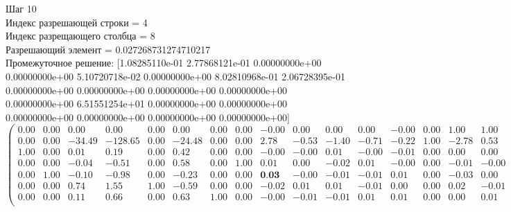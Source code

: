 \documentclass[draft]{article}
\begin{document}
\begin{flushleft}
    Шаг 10 \\
    Индекс разрешающей строки = 4\\
    Индекс разрещающего столбца = 8\\
    Разрешающий элемент = 0.027268731274710217\\
    Промежуточное решение:
    [1.08285110e-01  2.77868121e-01  0.00000000e+00  0.00000000e+00
    5.10720718e-02  0.00000000e+00  8.02810968e-01  2.06728395e-01
    0.00000000e+00  0.00000000e+00  0.00000000e+00  0.00000000e+00
    0.00000000e+00  6.51551254e+01  0.00000000e+00  0.00000000e+00
    0.00000000e+00  0.00000000e+00  0.00000000e+00  0.00000000e+00]
\begin{equation*}
\begin{pmatrix}
    0.00 & 0.00 &   0.00 &    0.00 & 0.00 &   0.00 & 0.00 & 0.00 & -0.00 &  0.00 &  0.00 &  0.00 & -0.00 & 0.00 &  1.00 &  1.00 &  1.00 &  1.00 &  1.00 &  1.00 & -0.00 \\
    0.00 & 0.00 & -34.49 & -128.65 & 0.00 & -24.48 & 0.00 & 0.00 &  2.78 & -0.53 & -1.40 & -0.71 & -0.22 & 1.00 & -2.78 &  0.53 &  1.40 &  0.71 &  0.22 & -1.00 & 65.16 \\
    1.00 & 0.00 &   0.01 &    0.19 & 0.00 &   0.42 & 0.00 & 0.00 & -0.00 & -0.00 &  0.01 & -0.00 & -0.01 & 0.00 &  0.00 &  0.00 & -0.01 &  0.00 &  0.01 &  0.00 &  0.11 \\
    0.00 & 0.00 &  -0.04 &   -0.51 & 0.00 &   0.58 & 0.00 & 1.00 &  0.01 &  0.00 & -0.02 &  0.01 & -0.00 & 0.00 & -0.01 & -0.00 &  0.02 & -0.01 &  0.00 &  0.00 &  0.21 \\
    0.00 & 1.00 &  -0.10 &   -0.98 & 0.00 &  -0.23 & 0.00 & 0.00 &  \textbf{0.03} & -0.00 & -0.01 & -0.01 &  0.01 & 0.00 & -0.03 &  0.00 &  0.01 &  0.01 & -0.01 &  0.00 &  0.28 \\
    0.00 & 0.00 &   0.74 &    1.55 & 1.00 &  -0.59 & 0.00 & 0.00 & -0.02 &  0.01 &  0.01 & -0.01 &  0.00 & 0.00 &  0.02 & -0.01 & -0.01 &  0.01 & -0.00 &  0.00 &  0.05 \\
    0.00 & 0.00 &   0.11 &    0.66 & 0.00 &   0.63 & 1.00 & 0.00 & -0.00 & -0.01 & -0.01 &  0.01 &  0.01 & 0.00 &  0.00 &  0.01 &  0.01 & -0.01 & -0.01 &  0.00 &  0.80 \\
\end{pmatrix}
\end{equation*}
\end{flushleft}
\end{document}
